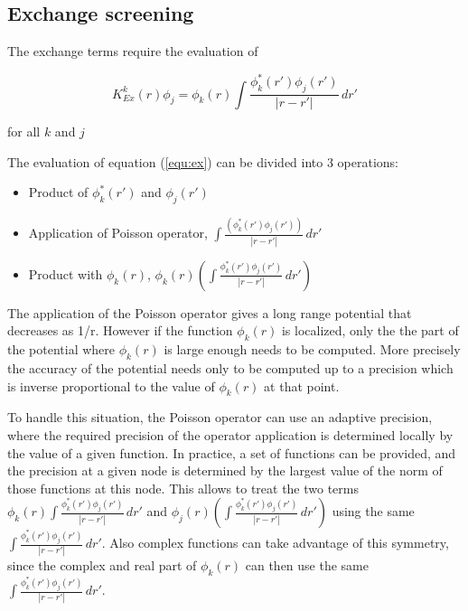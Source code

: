 \documentclass[%
 aip,
 amsmath,amssymb,
 reprint,%
]{revtex4-1}
\begin{document}


\subsection{Exchange screening}
\label{Xscreen}

The exchange terms require the evaluation of

\begin{equation}
\label{equ:ex}
  K_{Ex}^k(r) \phi_j = \phi_k(r) \int \frac{\phi^*_k(r')\phi_j(r')}{|r-r'|} \, dr'
\end{equation}

 for all $k$ and $j$

The evaluation of equation (\ref{equ:ex}) can be divided into 3 operations:
\begin{itemize}
\item Product of $\phi^*_k(r')$ and $\phi_j(r')$
\item Application of Poisson operator, $\int \frac{(\phi^*_k(r')\phi_j(r'))}{|r-r'|} \, dr'$
\item Product with $\phi_k(r)$, $\phi_k(r) (\int \frac{\phi^*_k(r')\phi_j(r')}{|r-r'|} \, dr')$
\end{itemize}

The application of the Poisson operator gives a long range potential that decreases as 1/r. However if the function $\phi_k(r)$ is localized, only the the part of the potential where $\phi_k(r)$ is large enough needs to be computed. More precisely the accuracy of the potential needs only to be computed up to a precision which is inverse proportional to the value of $\phi_k(r)$ at that point. 

To handle this situation, the Poisson operator can use an adaptive precision, where the required precision of the operator application is determined locally by the value of a given function. In practice, a set of functions can be provided, and the precision at a given node is determined by the largest value of the norm of those functions at this node. This allows to treat the two terms $\phi_k(r) \int \frac{\phi^*_k(r')\phi_j(r')}{|r-r'|} \, dr'$ and  $\phi_j(r) (\int \frac{\phi^*_k(r')\phi_j(r')}{|r-r'|} \, dr')$ using the same $\int \frac{\phi^*_k(r')\phi_j(r')}{|r-r'|} \, dr'$.  Also complex functions can take advantage of this symmetry, since the complex and real part of $\phi_k(r)$ can then use the same $\int \frac{\phi^*_k(r')\phi_j(r')}{|r-r'|} \, dr'$.
\end{document}
